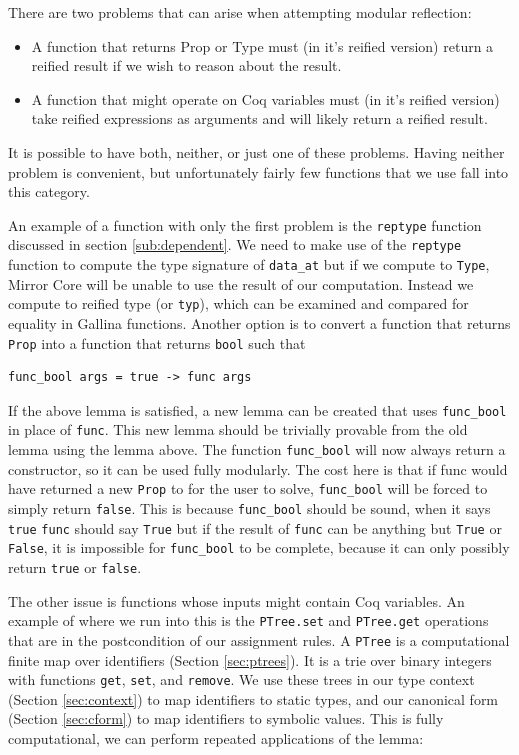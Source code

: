 \documentclass{puthesis}
\begin{document}
There are two problems that can arise when attempting modular reflection:

\begin{itemize}
\item A function that returns Prop or Type must (in it's reified version) return a reified
  result if we wish to reason about the result.
\item A function that might operate on Coq variables must (in it's
  reified version) take reified
  expressions as arguments and will likely return a reified result.
\end{itemize}

It is possible to have both, neither, or just one of these problems.
Having neither problem is convenient, but unfortunately fairly few
functions that we use fall into this category. 

An example of a function with only the first problem is the
\lstinline|reptype| function discussed in section
\ref{sub:dependent}. We need to make use of the \lstinline|reptype|
function to compute the type signature of \lstinline|data_at| but if we
compute to \lstinline|Type|, Mirror Core will be unable to use the
result of our computation. Instead we compute to reified type (or
\lstinline|typ|), which can be examined and compared for equality in
Gallina functions. Another option is to convert a function that
returns \lstinline|Prop| into a function that returns \lstinline|bool| such that

\begin{lstlisting}
func_bool args = true -> func args
\end{lstlisting}

If the above lemma is satisfied, a new lemma can be created that uses
\lstinline|func_bool| in place of \lstinline|func|. This new lemma
should be trivially provable from the old lemma using the lemma
above. The function \lstinline|func_bool| will now always return a
constructor, so it can be used fully modularly. The cost here is that
if func would have returned a new \lstinline|Prop| to for the user to
solve, \lstinline|func_bool| will be forced to simply return
\lstinline|false|. This is because \lstinline|func_bool| should be
sound, when it says \lstinline|true| \lstinline|func| should say
\lstinline|True| but if the result of \lstinline|func| can be anything
but \lstinline|True| or \lstinline|False|, it is impossible for
\lstinline|func_bool| to be complete, because it can only possibly
return \lstinline|true| or \lstinline|false|.

The other issue is functions whose inputs might contain Coq
variables. An example of where we run into this is the
\lstinline|PTree.set| and \lstinline|PTree.get| operations that are in
the postcondition of our assignment rules. A \lstinline|PTree| is a
computational finite map over identifiers (Section \ref{sec:ptrees}). It is a trie over binary
integers with functions \lstinline|get|, \lstinline|set|, and
\lstinline|remove|. We use these trees in our type context (Section
\ref{sec:context}) to map identifiers to static types, and our
canonical form (Section \ref{sec:cform}) to map identifiers to
symbolic values. This is fully computational, we can perform repeated
applications of the lemma:
\end{document}
